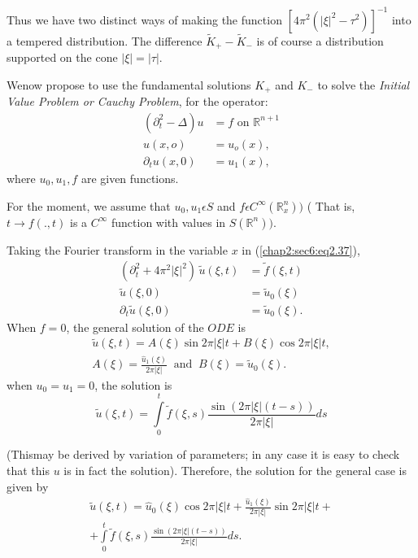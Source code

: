 Thus we have two distinct ways of making the function $[4 \pi^2
  (|\xi|^2 - \tau^2)]^{-1}$ into a tempered distribution. The
difference $\tilde{K}_+ - \tilde{K}_-$ is of course a distribution
supported on the cone $|\xi| = |\tau|$. 

We\pageoriginale now propose to use the fundamental solutions $K_+$ and $K_-$ to
solve the \textit{Initial Value Problem or Cauchy Problem}, for the
operator: 
\begin{equation*}
\begin{aligned}
  (\partial^2_t - \Delta ) u & = f  \text { on } \mathbb{R}^{n+1} \\
  u(x,o) & = u_o(x), \\ 
  \partial_t u(x,0) & = u_1(x),
\end{aligned}\tag{2.37}\label{chap2:sec6:eq2.37}
\end{equation*}
where $u_0,  u_1, f$ are given functions.

For the moment, we assume that $u_0, u_1 \epsilon S$ and $f
\epsilon C^\infty (\mathbb{R}^n_x))$ ( That is,  
$t \rightarrow f(.,t)$ is a $C^\infty$ function with values in
$S(\mathbb{R}^n))$. 

Taking the Fourier transform in the variable $x$ in
(\ref{chap2:sec6:eq2.37}),  
\begin{align*}
  (\partial^2_t + 4 \pi^2 |\xi|^2)\, \tilde{u}(\xi, t) & = \tilde{f}
  (\xi, t) \\ 
  \tilde{u} (\xi, 0) & = \tilde{u}_0 (\xi) \\
  \partial_t \tilde{u} (\xi, 0) & = \tilde{u}_0 (\xi).
\end{align*}
When $f= 0$, the general solution of the $ODE$ is
\begin{gather*}
  \tilde{u} (\xi, t) = A(\xi) \sin 2 \pi |\xi| t + B(\xi)\cos 2 \pi |\xi|t,\\ 
  A(\xi) = \frac{\hat{u}_1 (\xi)}{2 \pi |\xi|} ~\text{ and  }~ B (\xi) =
  \tilde{u}_0 (\xi). 
\end{gather*}
when $u_0 = u_1 =0$, the solution is 
$$
\tilde{u} (\xi, t) = \int\limits^t_0 \tilde{f}(\xi, s) 
\frac{\sin (2 \pi |\xi|(t - s))}{2 \pi |\xi|} ds  
$$

(This\pageoriginale may be derived by variation of parameters; in any case it is
easy to check that this $u$ is in fact the solution). Therefore, the
solution for the general case is given by  
\begin{gather*}
  \tilde{u}(\xi, t) = \hat{u}_0 (\xi) \cos 2 \pi |\xi| t +
  \frac{\hat{u}_1 (\xi)}{2 \pi |\xi |} \sin 2 \pi |\xi | t +\\ 
  + \int \limits^t_0 \tilde{f} (\xi, s)\frac{\sin (2 \pi |\xi
    |(t - s))}{2 \pi |\xi|} ds. 
\end{gather*}

